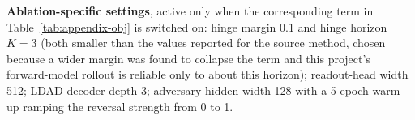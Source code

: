 \documentclass[12pt,a4paper,oneside]{report}
\begin{document}
\noindent\textbf{Ablation-specific settings}, active only when the corresponding term in
Table~\ref{tab:appendix-obj} is switched on: hinge margin 0.1 and hinge horizon $K=3$ (both smaller
than the values reported for the source method, chosen because a wider margin was found to collapse
the term and this project's forward-model rollout is reliable only to about this horizon);
readout-head width 512; LDAD decoder depth 3; adversary hidden width 128 with a 5-epoch warm-up
ramping the reversal strength from 0 to 1.
\end{document}
